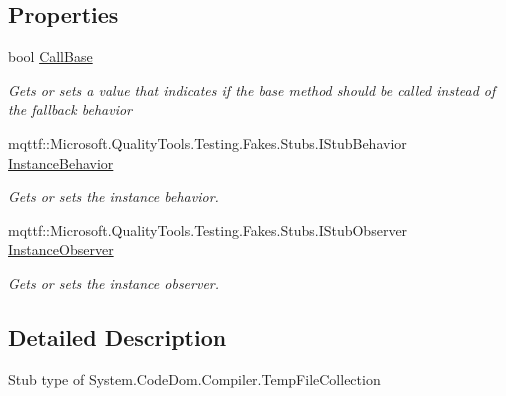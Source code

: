 \subsection*{Properties}
\begin{DoxyCompactItemize}
\item 
bool \hyperlink{class_system_1_1_code_dom_1_1_compiler_1_1_fakes_1_1_stub_temp_file_collection_a606ada52bc940922d119e967d2b0626c}{Call\-Base}
\begin{DoxyCompactList}\small\item\em Gets or sets a value that indicates if the base method should be called instead of the fallback behavior\end{DoxyCompactList}\item 
mqttf\-::\-Microsoft.\-Quality\-Tools.\-Testing.\-Fakes.\-Stubs.\-I\-Stub\-Behavior \hyperlink{class_system_1_1_code_dom_1_1_compiler_1_1_fakes_1_1_stub_temp_file_collection_a074d36addd3122461925a5960a8697bd}{Instance\-Behavior}
\begin{DoxyCompactList}\small\item\em Gets or sets the instance behavior.\end{DoxyCompactList}\item 
mqttf\-::\-Microsoft.\-Quality\-Tools.\-Testing.\-Fakes.\-Stubs.\-I\-Stub\-Observer \hyperlink{class_system_1_1_code_dom_1_1_compiler_1_1_fakes_1_1_stub_temp_file_collection_a037bc190b6fdcc8e177c469d11feb1a5}{Instance\-Observer}
\begin{DoxyCompactList}\small\item\em Gets or sets the instance observer.\end{DoxyCompactList}\end{DoxyCompactItemize}


\subsection{Detailed Description}
Stub type of System.\-Code\-Dom.\-Compiler.\-Temp\-File\-Collection



